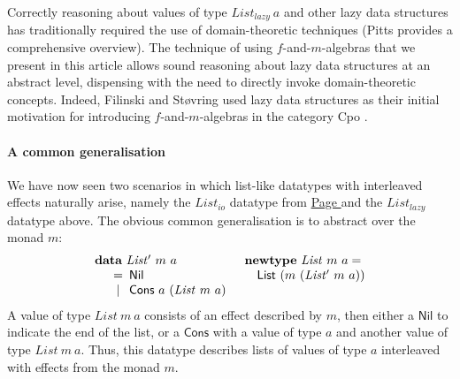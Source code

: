 \documentclass{jfp1}
\newcommand{\kw}[1]{\textbf{#1}}
\begin{document}
Correctly reasoning about values of type $\mathit{List_{lazy}}~a$ and
other lazy data structures has traditionally required the use of
domain-theoretic techniques (Pitts \cite{pitts96relational} provides a
comprehensive overview). The technique of using $f$-and-$m$-algebras
that we present in this article allows sound reasoning about lazy data
structures at an abstract level, dispensing with the need to directly
invoke domain-theoretic concepts. Indeed, Filinski and St\o{}vring
used lazy data structures as their initial motivation for introducing
$f$-and-$m$-algebras in the category Cpo \cite{filinski07inductive}.

\paragraph{A common generalisation} We have now seen two scenarios in which  
list-like datatypes with interleaved effects naturally arise, namely
the $\mathit{List_{io}}$ datatype from \hyperref[defn:listio]{Page
  \pageref*{defn:listio}} and the $\mathit{List_{lazy}}$ datatype
above. The obvious common generalisation is to abstract over the monad
$m$:
\begin{displaymath}
  \begin{array}{ll}
    \kw{data}~\mathit{List'}~m~a
    &
    \kw{newtype}~\mathit{List}~m~a = 
    \\
    \quad
    \begin{array}[t]{c@{\hspace{0.5em}}l}
      = & \mathsf{Nil} \\
      | & \mathsf{Cons}~a~(\mathit{List}~m~a) \\
    \end{array}
    &
    \quad \mathsf{List}~(m~(\mathit{List'}~m~a))
  \end{array}
\end{displaymath}
A value of type $\mathit{List}~m~a$ consists of an effect described by
$m$, then either a $\mathsf{Nil}$ to indicate the end of the list,
or a $\mathsf{Cons}$ with a value of type $a$ and another value of
type $\mathit{List}~m~a$. Thus, this datatype describes lists of values
of type $a$ interleaved with effects from the monad $m$.
\end{document}
